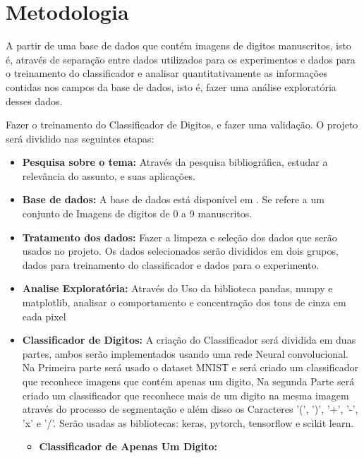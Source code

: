 \documentclass[conference]{IEEEtran}
\begin{document}
\section{Metodologia}

A partir de uma base de dados que contém imagens de digitos manuscritos, isto é, através de separação entre dados utilizados para os experimentos e dados para o treinamento do classificador e analisar quantitativamente as informações contidas nos campos da base de dados, isto é, fazer uma análise exploratória desses dados. 

Fazer o treinamento do Classificador de Digitos, e fazer uma validação. O projeto será dividido nas seguintes etapas:


\begin{itemize}
\item \textbf{Pesquisa sobre o tema:}
Através da pesquisa bibliográfica, estudar  a relevância do assunto, e suas aplicações.


\item \textbf{Base de dados:}
A base de dados está disponível em \cite{b1}. Se refere a um conjunto de Imagens de digitos de 0 a 9 manuscritos.


\item \textbf{Tratamento dos dados:}
Fazer a limpeza e seleção dos dados que serão usados no projeto. Os dados selecionados serão divididos em dois grupos, dados para treinamento do classificador e dados para o experimento.


\item \textbf{Analise Exploratória:}
Através do Uso da biblioteca pandas, numpy e matplotlib, analisar o comportamento e concentração dos tons de cinza em cada pixel

\item \textbf{Classificador de Digitos:}
	A criação do Classificador será dividida em duas partes, ambos serão implementados usando uma rede Neural  convolucional. Na Primeira parte será usado o dataset MNIST \cite{b1} e será criado um classificador que reconhece imagens que contém apenas um digito, Na segunda Parte será criado um classificador que reconhece mais de um digito na mesma imagem através do processo de segmentação e além disso os Caracteres '(', ')', '+', '-', 'x' e '/'. Serão usadas as bibliotecas: keras, pytorch, tensorflow e scikit learn.
	
	
    \begin{itemize}
        \item \textbf{Classificador de Apenas Um Digito:}
        

\end{itemize}
\end{itemize}
\end{document}

